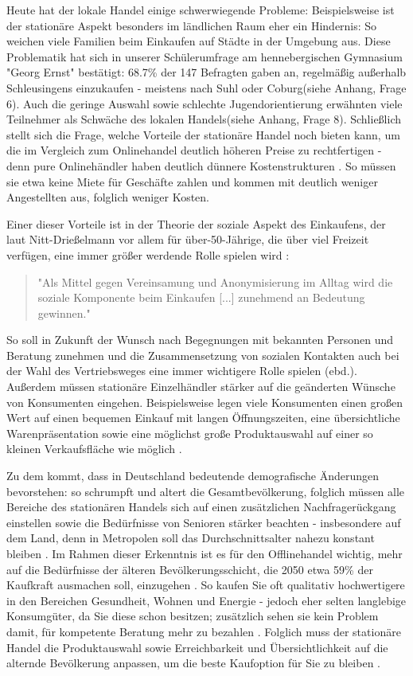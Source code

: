 \documentclass[a4paper, 12pt]{scrartcl}
\makeatletter
\newenvironment{folding}{\endgroup}{\begingroup \def \@currenvir{folding}\edef \@currenvline{\on@line}}
\makeatother
\begin{document}
\begin{folding}
Heute hat der lokale Handel einige schwerwiegende Probleme: 
Beispielsweise ist der stationäre Aspekt besonders im ländlichen Raum eher ein Hindernis: So weichen viele Familien beim Einkaufen auf Städte in der Umgebung aus. Diese Problematik hat sich in unserer Schülerumfrage am hennebergischen Gymnasium "Georg Ernst" bestätigt: 68.7\% der 147 Befragten gaben an, regelmäßig außerhalb Schleusingens einzukaufen - meistens nach Suhl oder Coburg(siehe Anhang, Frage 6).
Auch die geringe Auswahl sowie schlechte Jugendorientierung erwähnten viele Teilnehmer als Schwäche des lokalen Handels(siehe Anhang, Frage 8). Schließlich stellt sich die Frage, welche Vorteile der stationäre Handel noch bieten kann, um die im Vergleich zum Onlinehandel deutlich höheren Preise zu rechtfertigen - denn pure Onlinehändler haben deutlich dünnere Kostenstrukturen \cite[S. 14]{evilcom}. So müssen sie etwa keine Miete für Geschäfte zahlen und kommen mit deutlich weniger Angestellten aus, folglich weniger Kosten. 

Einer dieser Vorteile ist in der Theorie der soziale Aspekt des Einkaufens, der laut Nitt-Drießelmann vor allem für über-50-Jährige, die über viel Freizeit verfügen, eine immer größer werdende Rolle spielen wird \cite[S. 43f]{Nitt}:
\begin{quote}
"Als Mittel gegen Vereinsamung und Anonymisierung im Alltag wird die soziale Komponente beim Einkaufen [...] zunehmend an Bedeutung gewinnen." \cite[S. 43]{Nitt}
\end{quote} 
So soll in Zukunft der Wunsch nach Begegnungen mit bekannten Personen und Beratung zunehmen und die Zusammensetzung von sozialen Kontakten auch bei der Wahl des Vertriebsweges eine immer wichtigere Rolle spielen (ebd.).
Außerdem müssen stationäre Einzelhändler stärker auf die geänderten Wünsche von Konsumenten eingehen. Beispielsweise legen viele Konsumenten einen großen Wert auf einen bequemen Einkauf mit langen Öffnungszeiten, eine übersichtliche Warenpräsentation sowie eine möglichst große Produktauswahl auf einer so kleinen Verkaufsfläche wie möglich \cite[S. 61]{Nitt}.

Zu dem kommt, dass in Deutschland bedeutende demografische Änderungen bevorstehen: so schrumpft und altert die Gesamtbevölkerung, folglich müssen alle Bereiche des stationären Handels sich auf einen zusätzlichen Nachfragerückgang einstellen sowie die Bedürfnisse von Senioren stärker beachten - insbesondere auf dem Land, denn in Metropolen soll das Durchschnittsalter nahezu konstant bleiben \cite[S. 32ff]{Nitt}. Im Rahmen dieser Erkenntnis ist es für den Offlinehandel wichtig, mehr auf die Bedürfnisse der älteren Bevölkerungsschicht, die 2050 etwa 59\% der Kaufkraft ausmachen soll, einzugehen \cite[S. 64]{Nitt}. So kaufen Sie oft qualitativ hochwertigere in den Bereichen Gesundheit, Wohnen und Energie - jedoch eher selten langlebige Konsumgüter, da Sie diese schon besitzen; zusätzlich sehen sie kein Problem damit, für kompetente Beratung mehr zu bezahlen \cite[S. 41f]{Nitt}. Folglich muss der stationäre Handel die Produktauswahl sowie Erreichbarkeit und Übersichtlichkeit auf die alternde Bevölkerung anpassen, um die beste Kaufoption für Sie zu bleiben \cite[S. 64]{Nitt}.


\end{folding}
\end{document}
